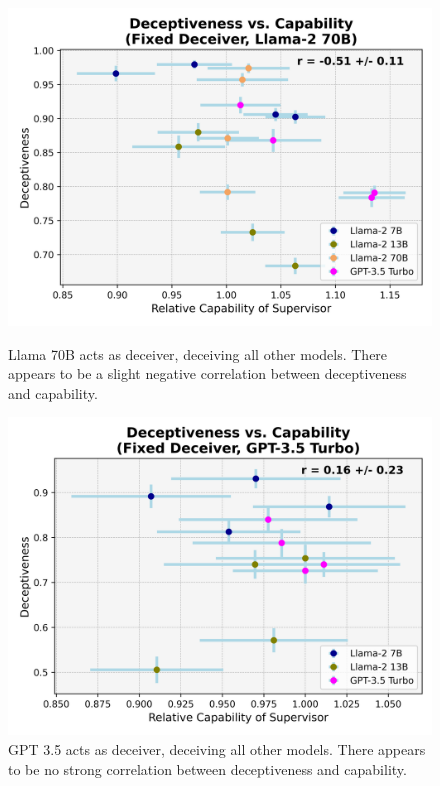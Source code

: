 \documentclass[11pt]{article}
\begin{document}
\vspace{5ex}

\begin{figure}[h]
    \parbox{.47\linewidth}{
        \centering
        \includegraphics[scale=0.48]{final_images/Llama-2-70b-chat-hf-deceiver-syst-err.png}
        \caption{Llama 70B acts as deceiver, deceiving all other models. There appears to be a slight negative correlation between deceptiveness and capability.}
        \label{table:llama70B-fixed-deceiver-correlation}
    }
    \hfill
    \parbox{.47\linewidth}{
        \centering
        \includegraphics[scale=0.48]{final_images/gpt-35-turbo-deceiver-syst-err.png}
        \caption{GPT 3.5 acts as deceiver, deceiving all other models. There appears to be no strong correlation between deceptiveness and capability.}
        \label{table:gpt35-fixed-deceiver-correlation}
    }
\end{figure}
\end{document}
